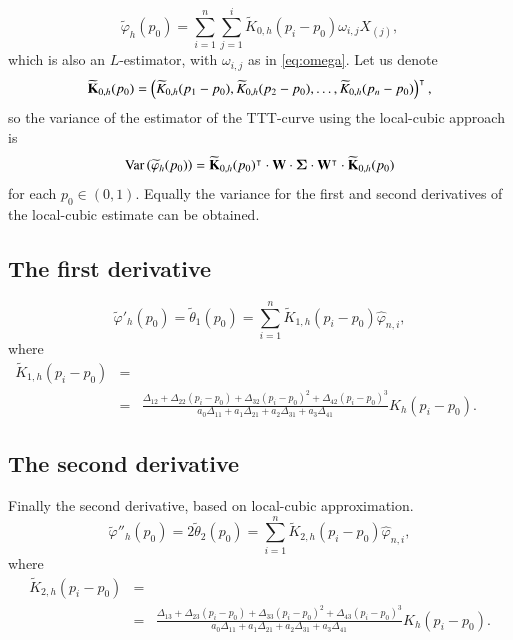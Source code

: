 \documentclass[preprint,12pt]{elsarticle}
\begin{document}
\begin{equation*}
\widetilde{\varphi}_h(p_0)= \sum_{i=1}^n \sum_{j=1}^i \widetilde{K}_{0,h}(p_i-p_0)\omega_{i,j}X_{(j)},
\end{equation*}
which is also an $L$-estimator, with $\omega_{i,j}$ as in \eqref{eq:omega}. Let us denote 
$$\widetilde{\bf K}_{0,h}(p_0)=\left(\widetilde{ K}_{0,h}(p_1-p_0), \widetilde{ K}_{0,h}(p_2-p_0),\ldots,\widetilde{ K}_{0,h}(p_n-p_0)\right)^{\intercal},$$
 so the variance of the estimator of the TTT-curve using the local-cubic approach is
\begin{equation}\label{V.phi0.cubic}
{\rm Var} \left(\widetilde{\varphi}_h(p_0)\right)= \widetilde{\bf K}_{0,h}(p_0)^{\intercal}\cdot {\bf W} \cdot {\boldsymbol{\Sigma}}\cdot  {\bf W}^{\intercal}\cdot \widetilde{\bf K}_{0,h}(p_0)
\end{equation}
for each $p_0 \in (0,1)$. Equally the variance for the first and second derivatives of the local-cubic estimate can be obtained.
 

\subsection{The first derivative} %
\begin{equation}\label{dphi.cub}
\widetilde{\varphi}'_h(p_0)=\widetilde{\theta}_1(p_0)= \sum_{i=1}^n \widetilde{K}_{1,h}\left(p_i-p_0\right) \widehat{\varphi}_{n,i},
\end{equation}
where
\begin{eqnarray*}
\widetilde{K}_{1,h}\left(p_i-p_0\right)&=& \\
&=&\frac{\Delta_{12}+\Delta_{22}\left(p_i-p_0 \right)+\Delta_{32}\left(p_i-p_0 \right)^2+\Delta_{42}\left(p_i-p_0 \right)^3}{a_0 \Delta_{11}+ a_1 \Delta_{21}+a_2 \Delta_{31}+a_3 \Delta_{41}}  K_h\left(p_i-p_0\right). \qquad
\end{eqnarray*}



\subsection{The second derivative}%
Finally the second derivative, based on local-cubic approximation.
\begin{equation}\label{d2phi.cub}
\widetilde{\varphi}''_h(p_0)= 2 \widetilde{\theta}_2(p_0)= \sum_{i=1}^n \widetilde{K}_{2,h}\left(p_i-p_0\right) \widehat{\varphi}_{n,i},
\end{equation}
where 
\begin{eqnarray*}
\widetilde{K}_{2,h}\left(p_i-p_0\right)&=&\\
&=& \frac{\Delta_{13}+\Delta_{23}\left(p_i-p_0 \right)+\Delta_{33}\left(p_i-p_0 \right)^2+\Delta_{43}\left(p_i-p_0 \right)^3}{a_0 \Delta_{11}+ a_1 \Delta_{21}+a_2 \Delta_{31}+a_3 \Delta_{41}} K_h\left(p_i-p_0\right).
\end{eqnarray*}
\end{document}
